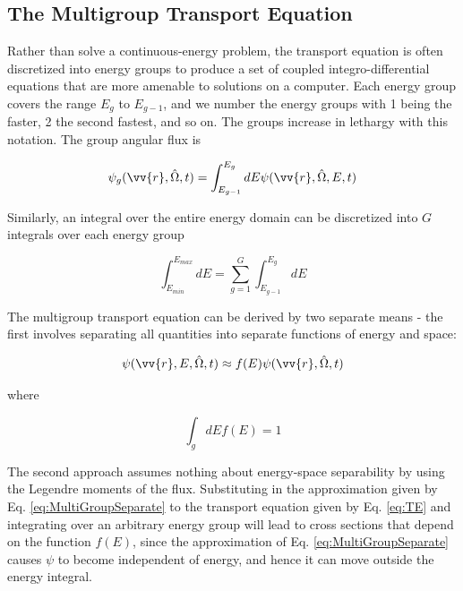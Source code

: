 \documentclass[10pt]{article}
\begin{document}
\begin{flushleft}
\section{The Multigroup Transport Equation}

Rather than solve a continuous-energy problem, the transport equation is often discretized into energy groups to produce a set of coupled integro-differential equations that are more amenable to solutions on a computer. Each energy group covers the range \(E_g\) to \(E_{g-1}\), and we number the energy groups with 1 being the faster, 2 the second fastest, and so on. The groups increase in lethargy with this notation. The group angular flux is

\begin{equation}
\label{eq:GrpAngularFlux}
\psi_g (\vv{r}, \hat{\Omega},t) = \int_{E_{g-1}}^{E_g} dE \psi(\vv{r}, \hat{\Omega},E, t)
\end{equation}

Similarly, an integral over the entire energy domain can be discretized into \(G\) integrals over each energy group

\begin{equation}
\label{eq:dEMultiGroup}
\int_{E_{min}}^{E_{max}}dE = \sum_{g=1}^{G} \int_{E_{g-1}}^{E_g} dE
\end{equation}

The multigroup transport equation can be derived by two separate means - the first involves separating all quantities into separate functions of energy and space:

\begin{equation}
\label{eq:MultiGroupSeparate}
\psi(\vv{r}, E, \hat{\Omega},t) \approx f(E)\psi(\vv{r}, \hat{\Omega},t)
\end{equation}

where

\begin{equation}
\label{eq:f_E_normalized}
\int_{g} dEf(E) = 1
\end{equation}

The second approach assumes nothing about energy-space separability by using the Legendre moments of the flux. Substituting in the approximation given by Eq. \ref{eq:MultiGroupSeparate} to the transport equation given by Eq. \ref{eq:TE} and integrating over an arbitrary energy group will lead to cross sections that depend on the function \(f(E)\), since the approximation of Eq. \ref{eq:MultiGroupSeparate} causes \(\psi\) to become independent of energy, and hence it can move outside the energy integral.


\end{flushleft}
\end{document}

